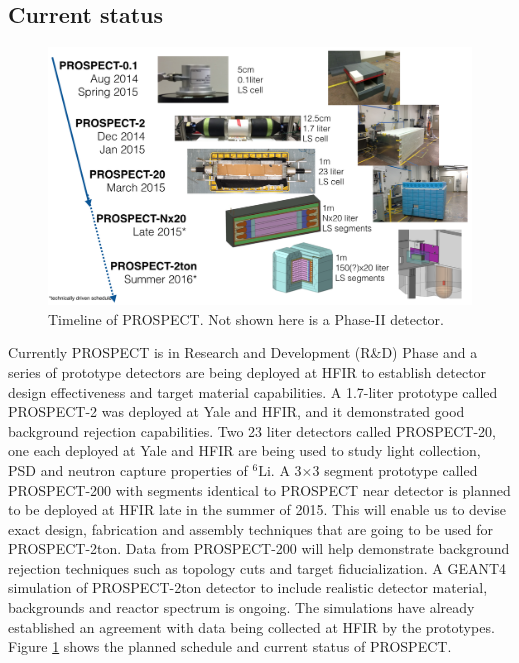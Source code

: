 \documentclass[11pt]{article}
\numberwithin{equation}{section}
\begin{document}
\subsection[Current status]{Current status}
\label{sec:status}

 \begin{figure}[h]
\centering
\includegraphics*[width=\textwidth]{./Schedule.PNG}
\caption[PROSPECT timeline]{Timeline of PROSPECT. Not shown here is a Phase-II detector.}
\label{fig:schedule}
\end{figure}
Currently PROSPECT is in Research and Development (R\&D) Phase and a series of prototype detectors are being deployed at HFIR to establish detector design effectiveness and target material capabilities. A 1.7-liter prototype called PROSPECT-2 was deployed at Yale and HFIR, and it demonstrated good background rejection capabilities. Two 23 liter detectors called PROSPECT-20, one each deployed at Yale and HFIR are being used to study light collection, PSD and  neutron capture properties of $^6 \textrm{Li}$. A 3$\times$3 segment prototype called PROSPECT-200 with segments identical to PROSPECT near detector is planned to be deployed at HFIR late in the summer of 2015. This will enable us to devise exact design, fabrication and assembly techniques that are going to be used for PROSPECT-2ton. Data from PROSPECT-200 will help demonstrate background rejection techniques such as topology cuts and target fiducialization. A GEANT4 simulation of PROSPECT-2ton detector to include realistic detector material, backgrounds and reactor spectrum is ongoing. The simulations have already established an agreement with data being collected at HFIR by the prototypes. Figure \ref{fig:schedule} shows the planned schedule and current status of  PROSPECT.
\end{document}
